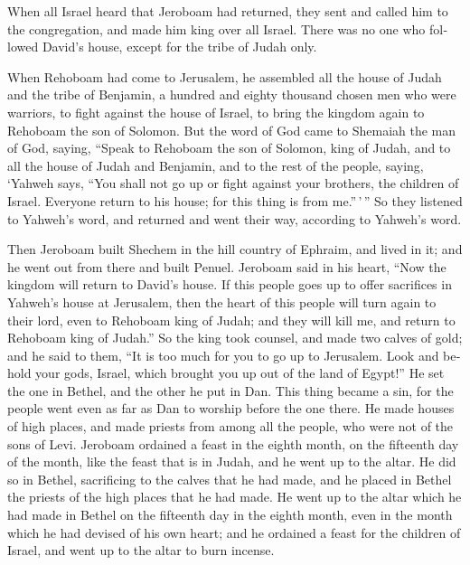 \begin{paracol}{2}
\begin{otherlanguage}{english}
 When all Israel heard that Jeroboam had returned, they
sent and called him to the congregation, and made him king over all
Israel. There was no one who followed David's house, except for the
tribe of Judah only.

 When Rehoboam had come to Jerusalem, he assembled all
the house of Judah and the tribe of Benjamin, a hundred and eighty
thousand chosen men who were warriors, to fight against the house of
Israel, to bring the kingdom again to Rehoboam the son of Solomon.
 But the word of God came to Shemaiah the man of God,
saying,  ``Speak to Rehoboam the son of Solomon, king of
Judah, and to all the house of Judah and Benjamin, and to the rest of
the people, saying,  `Yahweh says, ``You shall not go up
or fight against your brothers, the children of Israel. Everyone return
to his house; for this thing is from me.''\,'\,'' So they listened to
Yahweh's word, and returned and went their way, according to Yahweh's
word.

 Then Jeroboam built Shechem in the hill country of
Ephraim, and lived in it; and he went out from there and built Penuel.
 Jeroboam said in his heart, ``Now the kingdom will
return to David's house.  If this people goes up to offer
sacrifices in Yahweh's house at Jerusalem, then the heart of this people
will turn again to their lord, even to Rehoboam king of Judah; and they
will kill me, and return to Rehoboam king of Judah.''  So
the king took counsel, and made two calves of gold; and he said to them,
``It is too much for you to go up to Jerusalem. Look and behold your
gods, Israel, which brought you up out of the land of Egypt!''
 He set the one in Bethel, and the other he put in Dan.
 This thing became a sin, for the people went even as far
as Dan to worship before the one there.  He made houses
of high places, and made priests from among all the people, who were not
of the sons of Levi.  Jeroboam ordained a feast in the
eighth month, on the fifteenth day of the month, like the feast that is
in Judah, and he went up to the altar. He did so in Bethel, sacrificing
to the calves that he had made, and he placed in Bethel the priests of
the high places that he had made.  He went up to the
altar which he had made in Bethel on the fifteenth day in the eighth
month, even in the month which he had devised of his own heart; and he
ordained a feast for the children of Israel, and went up to the altar to
burn incense.


\end{otherlanguage}
\end{paracol}
